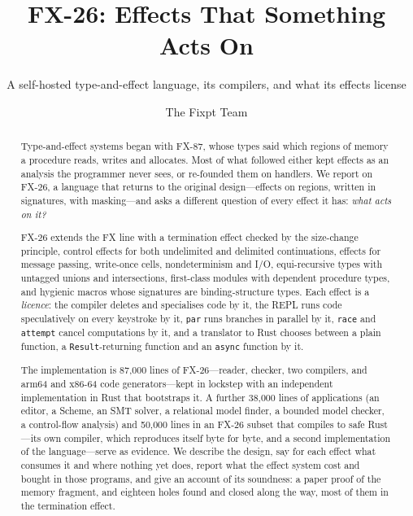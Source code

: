 \documentclass[acmsmall,screen,review]{acmart}
\newcommand{\cd}[1]{\texttt{#1}}
\newcommand{\fx}{FX-26}
\begin{document}
\title{FX-26: Effects That Something Acts On}
\subtitle{A self-hosted type-and-effect language, its compilers, and what its
effects license}

\author{The Fixpt Team}

\begin{abstract}
Type-and-effect systems began with FX-87, whose types said which regions
of memory a procedure reads, writes and allocates. Most of what followed
either kept effects as an analysis the programmer never sees, or
re-founded them on handlers. We report on \fx, a language that returns
to the original design---effects on regions, written in signatures,
with masking---and asks a different question of every effect it has:
\emph{what acts on it?}

\fx{} extends the FX line with a termination effect checked by the
size-change principle, control effects for both undelimited and delimited
continuations, effects for message passing, write-once cells,
nondeterminism and I/O, equi-recursive types with untagged unions and
intersections, first-class modules with dependent procedure types, and
hygienic macros whose signatures are binding-structure types. Each effect
is a \emph{licence}: the compiler deletes and specialises code by it, the
REPL runs code speculatively on every keystroke by it, \cd{par} runs
branches in parallel by it, \cd{race} and \cd{attempt} cancel
computations by it, and a translator to Rust chooses between a plain
function, a \cd{Result}-returning function and an \cd{async} function
by it.

The implementation is 87,000 lines of \fx{}---reader, checker, two
compilers, and arm64 and x86-64 code generators---kept in lockstep with
an independent implementation in Rust that bootstraps it. A further
38,000 lines of applications (an editor, a Scheme, an SMT solver, a
relational model finder, a bounded model checker, a control-flow
analysis) and 50,000 lines in an \fx{} subset that compiles to safe
Rust---its own compiler, which reproduces itself byte for byte, and a
second implementation of the language---serve as evidence. We describe the design, say for each effect what consumes it and
where nothing yet does, report what the effect system cost and bought
in those programs, and give an account of its soundness: a paper proof of the memory fragment,
and eighteen holes found and closed along the way, most of them in the
termination effect.
\end{abstract}
\end{document}
